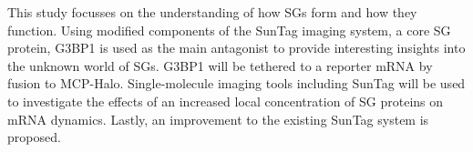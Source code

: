 This study focusses on the understanding of how SGs form and how they function.
Using modified components of the SunTag imaging system, a core SG protein, G3BP1 is used as the main antagonist to provide interesting insights into the unknown world of SGs.
G3BP1 will be tethered to a reporter mRNA by fusion to MCP-Halo.
Single-molecule imaging tools including SunTag will be used to investigate the effects of an increased local concentration of SG proteins on mRNA dynamics.
Lastly, an improvement to the existing SunTag system is proposed.
